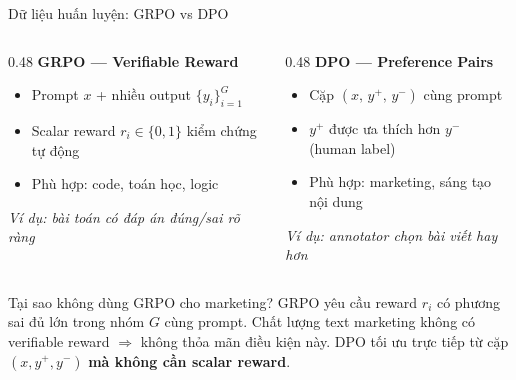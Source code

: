 \begin{frame}[t]{Dữ liệu huấn luyện: GRPO vs DPO}
  \begin{columns}[T,onlytextwidth]
    \begin{column}{0.48\textwidth}
      \textbf{\color{bkblue}GRPO --- Verifiable Reward}
      \begin{itemize}\small
        \item Prompt $x$ + nhiều output $\{y_i\}_{i=1}^G$
        \item Scalar reward $r_i \in \{0,1\}$ kiểm chứng tự động
        \item Phù hợp: code, toán học, logic
      \end{itemize}
      \vspace{0.5em}
      \scriptsize
      \textit{Ví dụ: bài toán có đáp án đúng/sai rõ ràng}
    \end{column}
    \begin{column}{0.48\textwidth}
      \textbf{\color{orange}DPO --- Preference Pairs}
      \begin{itemize}\small
        \item Cặp $(x,\, y^+,\, y^-)$ cùng prompt
        \item $y^+$ được ưa thích hơn $y^-$ (human label)
        \item Phù hợp: marketing, sáng tạo nội dung
      \end{itemize}
      \vspace{0.5em}
      \scriptsize
      \textit{Ví dụ: annotator chọn bài viết hay hơn}
    \end{column}
  \end{columns}

  \vspace{0.5em}
  \begin{block}{Tại sao không dùng GRPO cho marketing?}
    \scriptsize
    GRPO yêu cầu reward $r_i$ có phương sai đủ lớn trong nhóm $G$ cùng prompt.
    Chất lượng text marketing không có verifiable reward $\Rightarrow$ không thỏa mãn điều kiện này.
    DPO tối ưu trực tiếp từ cặp $(x, y^+, y^-)$ \textbf{mà không cần scalar reward}.
  \end{block}

\end{frame}
